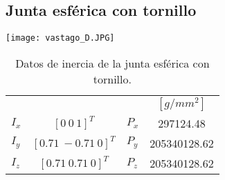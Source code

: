 \subsection{Junta esférica con tornillo}
\texttt{[image: vastago\_D.JPG]}
\begin{table}[hb!]
 \begin{center}
\begin{tabular}{lclc}


% 

 & & & $[g/mm^2]$\\
 $ I_x $ & $ [0 \ 0 \ 1]^T $ & $ P_x $ & 297124.48\\
 $ I_y $ & $ [0.71 \ -0.71 \ 0]^T $ & $ P_y $ & 205340128.62\\
 $ I_z $ & $ [0.71 \ 0.71 \ 0]^T $ & $ P_z $ & 205340128.62
\end{tabular}
\end{center}
\caption{Datos de inercia de la junta esférica con tornillo.}
\label{tab: inertia table joint}
\end{table}
